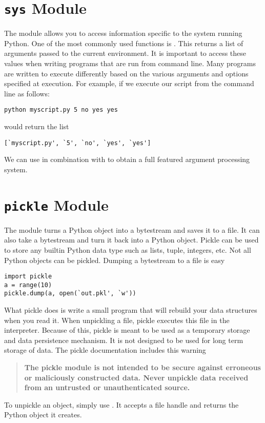 \section*{\texttt{sys} Module}
The  module allows you to access information specific to the system running Python.
One of the most commonly used functions is .
This returns a list of arguments passed to the current environment.
It is important to access these values when writing programs that are run from command line.
Many programs are written to execute differently based on the various arguments and options specified at execution.
For example, if we execute our script from the command line as follows:
\begin{verbatim}
python myscript.py 5 no yes yes
\end{verbatim}
 would return the list
\begin{verbatim}
[`myscript.py', `5', `no', `yes', `yes']
\end{verbatim}
We can use  in combination with  to obtain a full featured argument processing system.

\section*{\texttt{pickle} Module}
The  module turns a Python object into a bytestream and saves it to a file.
It can also take a bytestream and turn it back into a Python object.
Pickle can be used to store any builtin Python data type such as lists, tuple, integers, etc.
Not all Python objects can be pickled.
Dumping a bytestream to a file is easy
\begin{lstlisting}
import pickle
a = range(10)
pickle.dump(a, open(`out.pkl', `w'))
\end{lstlisting}
What pickle does is write a small program that will rebuild your data structures when you read it.
When unpickling a file, pickle executes this file in the interpreter.
Because of this, pickle is meant to be used as a temporary storage and data persistence mechanism.
It is not designed to be used for long term storage of data.
The pickle documentation includes this warning
\begin{quote}
\textbf{The pickle module is not intended to be secure against erroneous or maliciously constructed data.
Never unpickle data received from an untrusted or unauthenticated source.}
\end{quote}
To unpickle an object, simply use .
It accepts a file handle and returns the Python object it creates.

